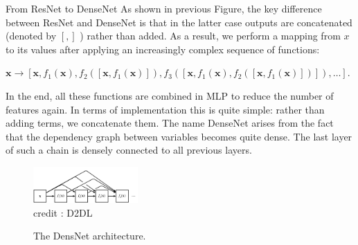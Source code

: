 \begin{vbframe}{From ResNet to DenseNet}
\small 
As shown in previous Figure, the key difference between ResNet and DenseNet is that in the latter case outputs are concatenated (denoted by  $[,]$ ) rather than added. As a result, we perform a mapping from  $x$  to its values after applying an increasingly complex sequence of functions:

\vspace{0.2cm}
$\mathbf{x} \to \left[ \mathbf{x}, f_1(\mathbf{x}), f_2([\mathbf{x}, f_1(\mathbf{x})]), f_3([\mathbf{x}, f_1(\mathbf{x}), f_2([\mathbf{x}, f_1(\mathbf{x})])]), \ldots\right].$

\vspace{0.2cm}
\small
In the end, all these functions are combined in MLP to reduce the number of features again. In terms of implementation this is quite simple: rather than adding terms, we concatenate them. 
\newline
The name DenseNet arises from the fact that the dependency graph between variables becomes quite dense. The last layer of such a chain is densely connected to all previous layers. 

\vspace{-0.4cm}
  \begin{figure}
    \centering
    \includegraphics[width=4cm]{plots/moderncnn/densenet.png}
    \tiny{\\ credit : D2DL}
    \caption{The DensNet architecture.}
  \end{figure}
  
 \end{vbframe}
